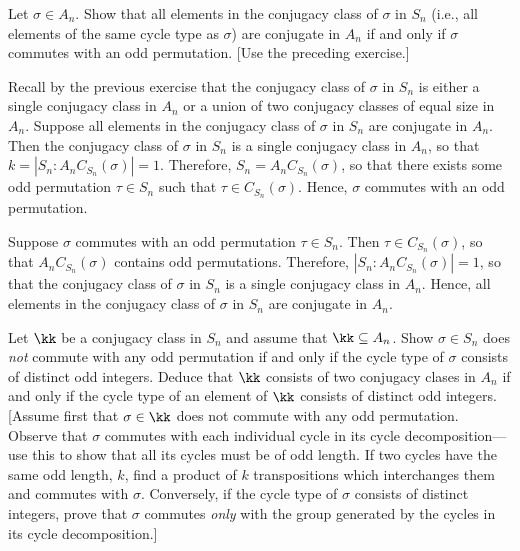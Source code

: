 \begin{exercise}
	Let $\sigma \in A_n$. Show that all elements in the conjugacy class of $\sigma$ in $S_n$ (i.e., all elements of the same cycle type as $\sigma$) are conjugate in $A_n$ if and only if $\sigma$ commutes with an odd permutation. [Use the preceding exercise.]
\end{exercise}

\begin{sol}
	\rightimp Recall by the previous exercise that the conjugacy class of $\sigma$ in $S_n$ is either a single conjugacy class in $A_n$ or a union of two conjugacy classes of equal size in $A_n$. Suppose all elements in the conjugacy class of $\sigma$ in $S_n$ are conjugate in $A_n$. Then the conjugacy class of $\sigma$ in $S_n$ is a single conjugacy class in $A_n$, so that $k = |S_n : A_nC_{S_n}(\sigma)| = 1$. Therefore, $S_n = A_nC_{S_n}(\sigma)$, so that there exists some odd permutation $\tau \in S_n$ such that $\tau \in C_{S_n}(\sigma)$. Hence, $\sigma$ commutes with an odd permutation.

	\leftimp Suppose $\sigma$ commutes with an odd permutation $\tau \in S_n$. Then $\tau \in C_{S_n}(\sigma)$, so that $A_nC_{S_n}(\sigma)$ contains odd permutations. Therefore, $|S_n : A_nC_{S_n}(\sigma)| = 1$, so that the conjugacy class of $\sigma$ in $S_n$ is a single conjugacy class in $A_n$. Hence, all elements in the conjugacy class of $\sigma$ in $S_n$ are conjugate in $A_n$.
\end{sol}

\newpage

\begin{specialexercise}
	Let $\kk$ be a conjugacy class in $S_n$ and assume that $\kk \subseteq A_n$. Show $\sigma \in S_n$ does \emph{not} commute with any odd permutation if and only if the cycle type of $\sigma$ consists of distinct odd integers. Deduce that $\kk$ consists of two conjugacy clases in $A_n$ if and only if the cycle type of an element of $\kk$ consists of distinct odd integers. [Assume first that $\sigma \in \kk$ does not commute with any odd permutation. Observe that $\sigma$ commutes with each individual cycle in its cycle decomposition---use this to show that all its cycles must be of odd length. If two cycles have the same odd length, $k$, find a product of $k$ transpositions which interchanges them and commutes with $\sigma$. Conversely, if the cycle type of $\sigma$ consists of distinct integers, prove that $\sigma$ commutes \emph{only} with the group generated by the cycles in its cycle decomposition.]
\end{specialexercise}


